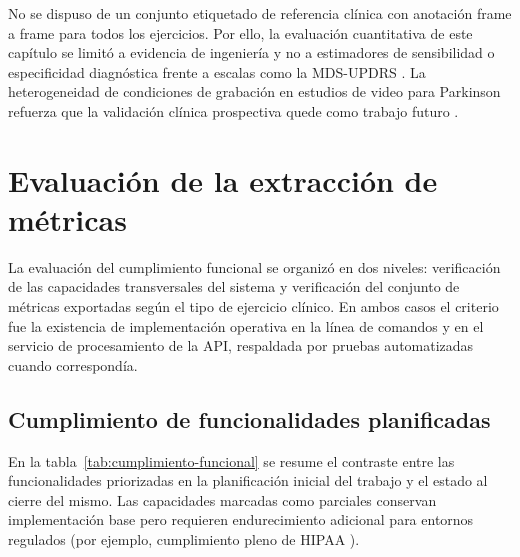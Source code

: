 No se dispuso de un conjunto etiquetado de referencia clínica con anotación frame a frame para todos los ejercicios. Por ello, la evaluación cuantitativa de este capítulo se limitó a evidencia de ingeniería y no a estimadores de sensibilidad o especificidad diagnóstica frente a escalas como la MDS-UPDRS \citep{acevedo2025visionmd}. La heterogeneidad de condiciones de grabación en estudios de video para Parkinson refuerza que la validación clínica prospectiva quede como trabajo futuro \citep{pecoraro2025computer,sibley2021video}.


\section{Evaluación de la extracción de métricas}
\label{sec:evaluacion-metricas}

La evaluación del cumplimiento funcional se organizó en dos niveles: verificación de las capacidades transversales del sistema y verificación del conjunto de métricas exportadas según el tipo de ejercicio clínico. En ambos casos el criterio fue la existencia de implementación operativa en la línea de comandos y en el servicio de procesamiento de la API, respaldada por pruebas automatizadas cuando correspondía.

\subsection{Cumplimiento de funcionalidades planificadas}

En la tabla~\ref{tab:cumplimiento-funcional} se resume el contraste entre las funcionalidades priorizadas en la planificación inicial del trabajo y el estado al cierre del mismo. Las capacidades marcadas como parciales conservan implementación base pero requieren endurecimiento adicional para entornos regulados (por ejemplo, cumplimiento pleno de HIPAA \citep{hipaa1996}).

